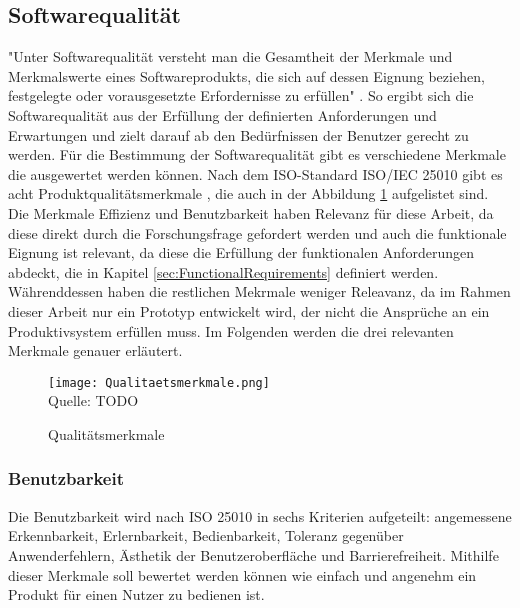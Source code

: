 \subsection{Softwarequalität}
"Unter Softwarequalität versteht man die Gesamtheit der Merkmale und Merkmalswerte eines Softwareprodukts, die sich auf dessen Eignung beziehen, festgelegte oder vorausgesetzte Erfordernisse zu erfüllen" \cite[S.~257]{Balzert1998}. So ergibt sich die Softwarequalität aus der Erfüllung der definierten Anforderungen und Erwartungen und zielt darauf ab den Bedürfnissen der Benutzer gerecht zu werden. Für die Bestimmung der Softwarequalität gibt es verschiedene Merkmale die ausgewertet werden können. Nach dem ISO-Standard ISO/IEC 25010 gibt es acht Produktqualitätsmerkmale \cite{ISO25010}, die auch in der Abbildung \ref{fig:SoftwareQuality} aufgelistet sind. Die Merkmale Effizienz und Benutzbarkeit haben Relevanz für diese Arbeit, da diese direkt durch die Forschungsfrage gefordert werden und auch die funktionale Eignung ist relevant, da diese die Erfüllung der funktionalen Anforderungen abdeckt, die in Kapitel \ref{sec:FunctionalRequirements} definiert werden. Währenddessen haben die restlichen Mekrmale weniger Releavanz, da im Rahmen dieser Arbeit nur ein Prototyp entwickelt wird, der nicht die Ansprüche an ein Produktivsystem erfüllen muss. Im Folgenden werden die drei relevanten Merkmale genauer erläutert.

\begin{figure}[H]
    \caption{Qualitätsmerkmale}\label{fig:SoftwareQuality}
    \texttt{[image: Qualitaetsmerkmale.png]}
    \\
    Quelle: TODO
\end{figure}

\subsubsection{Benutzbarkeit}
Die Benutzbarkeit wird nach ISO 25010 in sechs Kriterien aufgeteilt: angemessene Erkennbarkeit, Erlernbarkeit, Bedienbarkeit, Toleranz gegenüber Anwenderfehlern, Ästhetik der Benutzeroberfläche und Barrierefreiheit.
Mithilfe dieser Merkmale soll bewertet werden können wie einfach und angenehm ein Produkt für einen Nutzer zu bedienen ist.


